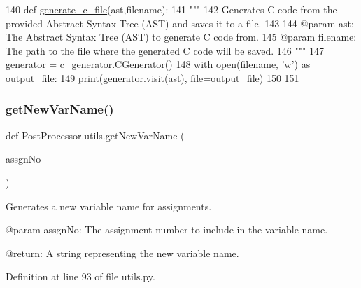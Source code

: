 \begin{DoxyCode}
140 \textcolor{keyword}{def }\hyperlink{namespacePostProcessor_1_1utils_a998fb471074ff747973a0d974eb9fbd1}{generate\_c\_file}(ast,filename):
141     \textcolor{stringliteral}{"""
}
142 \textcolor{stringliteral}{    Generates C code from the provided Abstract Syntax Tree (AST) and saves it to a file.
}
143 \textcolor{stringliteral}{
}
144 \textcolor{stringliteral}{    @param ast: The Abstract Syntax Tree (AST) to generate C code from.
}
145 \textcolor{stringliteral}{    @param filename: The path to the file where the generated C code will be saved.
}
146 \textcolor{stringliteral}{    """}
147     generator = c\_generator.CGenerator()
148     with open(filename, \textcolor{stringliteral}{'w'}) \textcolor{keyword}{as} output\_file:
149         print(generator.visit(ast), file=output\_file)
150 
151 
\end{DoxyCode}
\mbox{\label{namespacePostProcessor_1_1utils_a69c4094b747eccefbd43b8011b1c3626}} 
\subsubsection{\texorpdfstring{get\+New\+Var\+Name()}{getNewVarName()}}
{\footnotesize\ttfamily def Post\+Processor.\+utils.\+get\+New\+Var\+Name (\begin{DoxyParamCaption}\item[{}]{assgn\+No }\end{DoxyParamCaption})}

\begin{DoxyVerb}Generates a new variable name for assignments.

@param assgnNo: The assignment number to include in the variable name.

@return: A string representing the new variable name.
\end{DoxyVerb}
 

Definition at line 93 of file utils.\+py.


